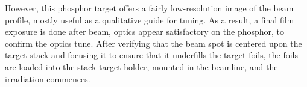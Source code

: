 However, this phosphor target offers a fairly low-resolution image of the beam profile, mostly useful as a qualitative guide for tuning.
As a result, a final film exposure is done after beam, optics appear satisfactory on the phosphor, to confirm the optics tune.
After verifying that 
the beam spot is centered upon the target stack and focusing it to ensure that it underfills the target foils, the foils are loaded into the stack target holder, mounted in the beamline, and the irradiation commences.
 








